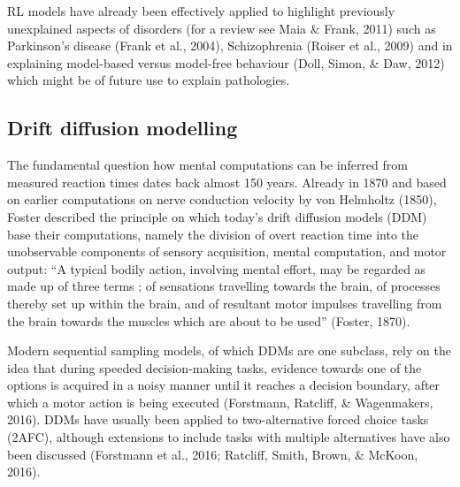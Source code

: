 \documentclass[12pt,openany]{book}
\theoremstyle{definition}
\theoremstyle{definition}
\theoremstyle{definition}
\theoremstyle{remark}
\begin{document}
RL models have already been effectively applied to highlight previously
unexplained aspects of disorders (for a review see Maia \& Frank, 2011)
such as Parkinson's disease (Frank et al., 2004), Schizophrenia (Roiser
et al., 2009) and in explaining model-based versus model-free behaviour
(Doll, Simon, \& Daw, 2012) which might be of future use to explain
pathologies.

\subsection{Drift diffusion modelling}\label{drift-diffusion-modelling}

The fundamental question how mental computations can be inferred from
measured reaction times dates back almost 150 years. Already in 1870 and
based on earlier computations on nerve conduction velocity by von
Helmholtz (1850), Foster described the principle on which today's drift
diffusion models (DDM) base their computations, namely the division of
overt reaction time into the unobservable components of sensory
acquisition, mental computation, and motor output: ``A typical bodily
action, involving mental effort, may be regarded as made up of three
terms ; of sensations travelling towards the brain, of processes thereby
set up within the brain, and of resultant motor impulses travelling from
the brain towards the muscles which are about to be used'' (Foster,
1870).

Modern sequential sampling models, of which DDMs are one subclass, rely
on the idea that during speeded decision-making tasks, evidence towards
one of the options is acquired in a noisy manner until it reaches a
decision boundary, after which a motor action is being executed
(Forstmann, Ratcliff, \& Wagenmakers, 2016). DDMs have usually been
applied to two-alternative forced choice tasks (2AFC), although
extensions to include tasks with multiple alternatives have also been
discussed (Forstmann et al., 2016; Ratcliff, Smith, Brown, \& McKoon,
2016).
\end{document}
